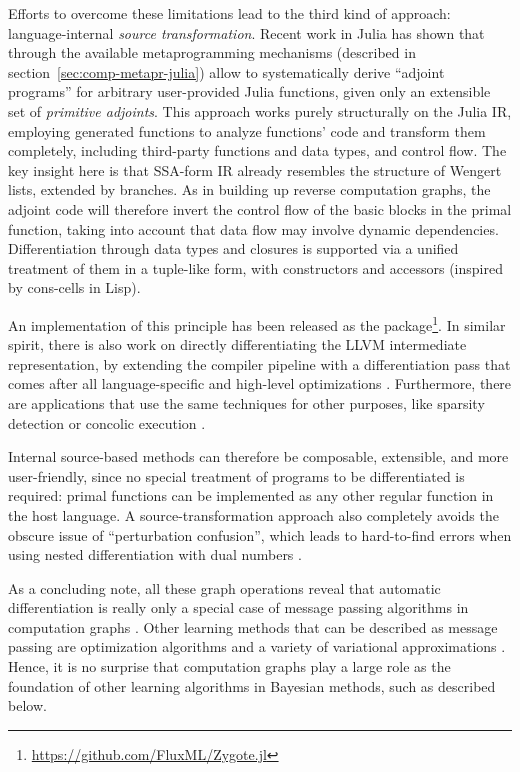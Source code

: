 Efforts to overcome these limitations lead to the third kind of approach: language-internal
\emph{source transformation}.  Recent work in Julia \parencite{innes2018don} has shown that through
the available metaprogramming mechanisms (described in section~\ref{sec:comp-metapr-julia}) allow to
systematically derive \enquote{adjoint programs} for arbitrary user-provided Julia functions, given
only an extensible set of \emph{primitive adjoints}.  This approach works purely structurally on the
Julia IR, employing generated functions to analyze functions' code and transform them completely,
including third-party functions and data types, and control flow.  The key insight here is that
SSA-form IR already resembles the structure of Wengert lists, extended by branches.  As in building
up reverse computation graphs, the adjoint code will therefore invert the control flow of the basic
blocks in the primal function, taking into account that data flow may involve dynamic dependencies.
Differentiation through data types and closures is supported via a unified treatment of them in a
tuple-like form, with constructors and accessors (inspired by cons-cells in Lisp).

An implementation of this principle has been released as the 
package\footnote{\url{https://github.com/FluxML/Zygote.jl}}.
In similar spirit, there is also work on directly differentiating the LLVM intermediate
representation, by extending the compiler pipeline with a differentiation pass that comes after all
language-specific and high-level optimizations \parencite{moses2020instead}.  Furthermore, there are
applications that use the same techniques for other purposes, like sparsity detection
\parencite{gowda2019sparsity} or concolic execution \parencite{churavy2019vchuravy}.  

Internal source-based methods can therefore be composable, extensible, and more user-friendly, since
no special treatment of programs to be differentiated is required: primal functions can be
implemented as any other regular function in the host language.  A source-transformation approach
also completely avoids the obscure issue of \enquote{perturbation confusion}, which leads to
hard-to-find errors when using nested differentiation with dual numbers
\parencite{baydin2018automatic,manzyuk2019perturbation}.

As a concluding note, all these graph operations reveal that automatic differentiation is really
only a special case of message passing algorithms in computation graphs
\parencite{minka2019automatic}.  Other learning methods that can be described as message passing are
optimization algorithms \parencite{ruozzi2011message,dauwels2005steepest} and a variety of
variational approximations \parencite{winn2005variational,minka2005divergence}.  Hence, it is no
surprise that computation graphs play a large role as the foundation of other learning algorithms in
Bayesian methods, such as described below.

